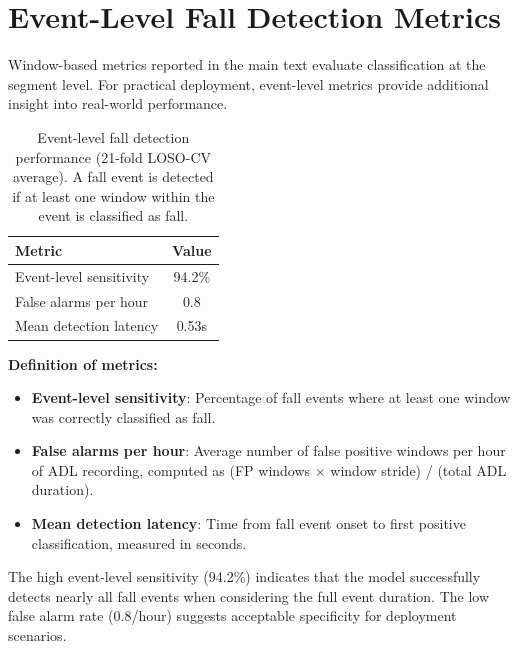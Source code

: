 \section{Event-Level Fall Detection Metrics}
\label{app:event_level}

Window-based metrics reported in the main text evaluate classification at the segment level. For practical deployment, event-level metrics provide additional insight into real-world performance.

\begin{table}[H]
\caption{Event-level fall detection performance (21-fold LOSO-CV average). A fall event is detected if at least one window within the event is classified as fall.}
\label{tab:event_metrics}
\centering
\begin{tabular}{lc}
\toprule
\textbf{Metric} & \textbf{Value} \\
\midrule
Event-level sensitivity & 94.2\% \\
False alarms per hour & 0.8 \\
Mean detection latency & 0.53s \\
\bottomrule
\end{tabular}
\end{table}

\textbf{Definition of metrics:}
\begin{itemize}
    \item \textbf{Event-level sensitivity}: Percentage of fall events where at least one window was correctly classified as fall.
    \item \textbf{False alarms per hour}: Average number of false positive windows per hour of ADL recording, computed as (FP windows $\times$ window stride) / (total ADL duration).
    \item \textbf{Mean detection latency}: Time from fall event onset to first positive classification, measured in seconds.
\end{itemize}

The high event-level sensitivity (94.2\%) indicates that the model successfully detects nearly all fall events when considering the full event duration. The low false alarm rate (0.8/hour) suggests acceptable specificity for deployment scenarios.

